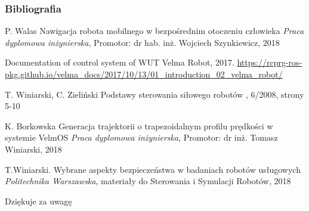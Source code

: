 
\begin{frame}[plain]
\addtocounter{framenumber}{-1}
\frametitle{Bibliografia}
\footnotesize{
\begin{thebibliography}{99} %
 P. Walas
\newblock Nawigacja robota mobilnego w bezpośrednim otoczeniu człowieka
\newblock \emph{Praca dyplomowa inżynierska}, Promotor: dr hab. inż. Wojciech Szynkiewicz, 2018

 Documentation of control system of WUT Velma Robot, 2017.
\newblock \url{https://rcprg-ros-pkg.github.io/velma\_docs/2017/10/13/01\_introduction\_02\_velma\_robot/}

 T. Winiarski, C. Zieliński
\newblock Podstawy sterowania siłowego robotów
, 6/2008, strony 5-10

 K. Borkowska
\newblock Generacja trajektorii o trapezoidalnym profilu prędkości w systemie VelmOS
\newblock \emph{Praca dyplomowa inżynierska}, Promotor: dr inż. Tomasz Winiarski, 2018

 T.Winiarski.
\newblock Wybrane aspekty bezpieczeństwa w badaniach robotów usługowych
\newblock \emph{Politechnika Warszawska}, materiały do Sterowania i Symulacji Robotów, 2018 
\end{thebibliography}
}
\end{frame}


\begin{frame}[plain]
\addtocounter{framenumber}{-1}
\Huge{\centerline{Dziękuje za uwagę}}
\end{frame}